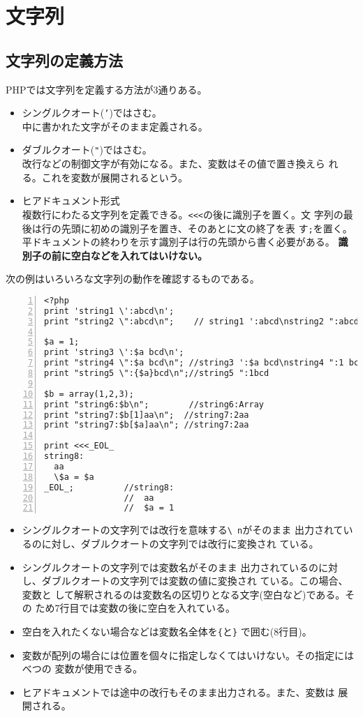 \section{文字列}
\subsection{文字列の定義方法}PHPでは文字列を定義する方法が3通りある。
\begin{itemize}
 \item シングルクオート(\texttt{'})ではさむ。\\
   中に書かれた文字がそのまま定義される。
 \item ダブルクオート(\Verb+"+)ではさむ。%
       \\改行などの制御文字が有効になる。また、変数はその値で置き換えら
       れる。これを変数が展開されるという。
 \item ヒアドキュメント形式\\
   複数行にわたる文字列を定義できる。\texttt{<<<}の後に識別子を置く。文
       字列の最後は行の先頭に初めの識別子を置き、そのあとに文の終了を表
       す\texttt{;}を置く。平ドキュメントの終わりを示す識別子は行の先頭から書く必要がある。
       {\bfseries 識別子の前に空白などを入れてはいけない。}
\end{itemize}
\begin{Exec}\upshape
次の例はいろいろな文字列の動作を確認するものである。
\begin{Verbatim}[numbers=left]
<?php
print 'string1 \':abcd\n';
print "string2 \":abcd\n";    // string1 ':abcd\nstring2 ":abcd

$a = 1;
print 'string3 \':$a bcd\n';
print "string4 \":$a bcd\n"; //string3 ':$a bcd\nstring4 ":1 bcd
print "string5 \":{$a}bcd\n";//string5 ":1bcd

$b = array(1,2,3);
print "string6:$b\n";        //string6:Array
print "string7:$b[1]aa\n";  //string7:2aa
print "string7:$b[$a]aa\n"; //string7:2aa

print <<<_EOL_
string8:
  aa
  \$a = $a
_EOL_;          //string8:
                //  aa
                //  $a = 1
\end{Verbatim}
\begin{itemize}
 \item シングルクオートの文字列では改行を意味する\texttt{\textbackslash
       n}がそのまま
       出力されているのに対し、ダブルクオートの文字列では改行に変換され
       ている。
 \item シングルクオートの文字列では変数名がそのまま
       出力されているのに対し、ダブルクオートの文字列では変数の値に変換され
       ている。この場合、変数と
       して解釈されるのは変数名の区切りとなる文字(空白など)である。その
       ため7行目では変数の後に空白を入れている。
 \item 空白を入れたくない場合などは変数名全体を\texttt{\{}と\texttt{\}}
       で囲む(8行目)。
 \item 変数が配列の場合には位置を個々に指定しなくてはいけない。その指定にはべつの
       変数が使用できる。
 \item ヒアドキュメントでは途中の改行もそのまま出力される。また、変数は
       展開される。
\end{itemize}
\end{Exec}
